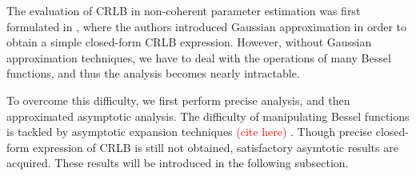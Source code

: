 \documentclass[12pt,draftclsnofoot,journal,onecolumn]{IEEEtran}
\theoremstyle{nonumberplain}
\def \ch {\textcolor{red}{(cite here) }}
\begin{document}
    The evaluation of CRLB in non-coherent parameter estimation was first formulated in \cite{jiang2016cramer}, where the authors introduced Gaussian approximation in order to obtain a simple closed-form CRLB expression. However, without Gaussian approximation techniques, we have to deal with the operations of many Bessel functions, and thus the analysis becomes nearly intractable. 

    To overcome this difficulty, we first perform precise analysis, and then approximated asymptotic analysis. The difficulty of manipulating Bessel functions is tackled by asymptotic expansion techniques \ch. Though precise closed-form expression of CRLB is still not obtained, satisfactory asymtotic results are acquired. These results will be introduced in the following subsection.  
    
\end{document}
